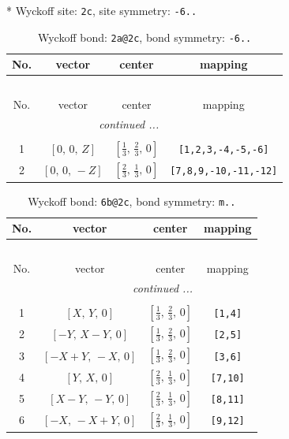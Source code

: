 \documentclass[fleqn,8pt]{jsarticle}
\begin{document}
* Wyckoff site: {\tt 2c}, site symmetry: {\tt -6..}
\renewcommand{\arraystretch}{1.2}
\begin{longtable}{cccc}
\caption{Wyckoff bond: {\tt 2a@2c}, bond symmetry: {\tt -6..}}
 \\
 \hline \hline
No. & vector & center & mapping \\ \hline \endfirsthead

\multicolumn{3}{l}{\tablename\ \thetable{}} \\
 \hline \hline
No. & vector & center & mapping \\ \hline \endhead

 \hline \hline
\multicolumn{3}{r}{\footnotesize\it continued ...} \\ \endfoot

 \hline \hline
\multicolumn{3}{r}{} \\ \endlastfoot

1 & $\left[ 0,\, 0,\, Z \right]$ & $\left[ \frac{1}{3},\, \frac{2}{3},\, 0 \right]$ & {\tt [1,2,3,-4,-5,-6]} \\ \hline
2 & $\left[ 0,\, 0,\, - Z \right]$ & $\left[ \frac{2}{3},\, \frac{1}{3},\, 0 \right]$ & {\tt [7,8,9,-10,-11,-12]} \\
\end{longtable}
\renewcommand{\arraystretch}{1.2}
\begin{longtable}{cccc}
\caption{Wyckoff bond: {\tt 6b@2c}, bond symmetry: {\tt m..}}
 \\
 \hline \hline
No. & vector & center & mapping \\ \hline \endfirsthead

\multicolumn{3}{l}{\tablename\ \thetable{}} \\
 \hline \hline
No. & vector & center & mapping \\ \hline \endhead

 \hline \hline
\multicolumn{3}{r}{\footnotesize\it continued ...} \\ \endfoot

 \hline \hline
\multicolumn{3}{r}{} \\ \endlastfoot

1 & $\left[ X,\, Y,\, 0 \right]$ & $\left[ \frac{1}{3},\, \frac{2}{3},\, 0 \right]$ & {\tt [1,4]} \\ \hline
2 & $\left[ - Y,\, X - Y,\, 0 \right]$ & $\left[ \frac{1}{3},\, \frac{2}{3},\, 0 \right]$ & {\tt [2,5]} \\ \hline
3 & $\left[ - X + Y,\, - X,\, 0 \right]$ & $\left[ \frac{1}{3},\, \frac{2}{3},\, 0 \right]$ & {\tt [3,6]} \\ \hline
4 & $\left[ Y,\, X,\, 0 \right]$ & $\left[ \frac{2}{3},\, \frac{1}{3},\, 0 \right]$ & {\tt [7,10]} \\ \hline
5 & $\left[ X - Y,\, - Y,\, 0 \right]$ & $\left[ \frac{2}{3},\, \frac{1}{3},\, 0 \right]$ & {\tt [8,11]} \\ \hline
6 & $\left[ - X,\, - X + Y,\, 0 \right]$ & $\left[ \frac{2}{3},\, \frac{1}{3},\, 0 \right]$ & {\tt [9,12]} \\
\end{longtable}
\end{document}
